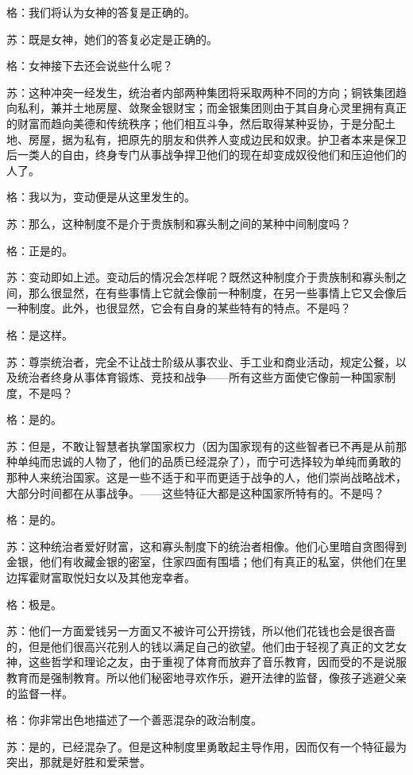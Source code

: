 \documentclass[12pt,oneside]{book}
\begin{document}
格：我们将认为女神的答复是正确的。

苏：既是女神，她们的答复必定是正确的。

格：女神接下去还会说些什么呢？

苏：这种冲突一经发生，统治者内部两种集团将采取两种不同的方向；铜铁集团趋向私利，兼并土地房屋、敛聚金银财宝；而金银集团则由于其自身心灵里拥有真正的财富而趋向美德和传统秩序；他们相互斗争，然后取得某种妥协，于是分配土地、房屋，据为私有，把原先的朋友和供养人变成边民和奴隶。护卫者本来是保卫后一类人的自由，终身专门从事战争捍卫他们的现在却变成奴役他们和压迫他们的人了。

格：我以为，变动便是从这里发生的。

苏：那么，这种制度不是介于贵族制和寡头制之间的某种中间制度吗？

格：正是的。

苏：变动即如上述。变动后的情况会怎样呢？既然这种制度介于贵族制和寡头制之间，那么很显然，在有些事情上它就会像前一种制度，在另一些事情上它又会像后一种制度。此外，也很显然，它会有自身的某些特有的特点。不是吗？

格：是这样。

苏：尊崇统治者，完全不让战士阶级从事农业、手工业和商业活动，规定公餐，以及统治者终身从事体育锻炼、竞技和战争——所有这些方面使它像前一种国家制度，不是吗？

格：是的。

苏：但是，不敢让智慧者执掌国家权力（因为国家现有的这些智者已不再是从前那种单纯而忠诚的人物了，他们的品质已经混杂了），而宁可选择较为单纯而勇敢的那种人来统治国家。这是一些不适于和平而更适于战争的人，他们崇尚战略战术，大部分时间都在从事战争。——这些特征大都是这种国家所特有的。不是吗？

格：是的。

苏：这种统治者爱好财富，这和寡头制度下的统治者相像。他们心里暗自贪图得到金银，他们有收藏金银的密室，住家四面有围墙；他们有真正的私室，供他们在里边挥霍财富取悦妇女以及其他宠幸者。

格：极是。

苏：他们一方面爱钱另一方面又不被许可公开捞钱，所以他们花钱也会是很吝啬的，但是他们很高兴花别人的钱以满足自己的欲望。他们由于轻视了真正的文艺女神，这些哲学和理论之友，由于重视了体育而放弃了音乐教育，因而受的不是说服教育而是强制教育。所以他们秘密地寻欢作乐，避开法律的监督，像孩子逃避父亲的监督一样。

格：你非常出色地描述了一个善恶混杂的政治制度。

苏：是的，已经混杂了。但是这种制度里勇敢起主导作用，因而仅有一个特征最为突出，那就是好胜和爱荣誉。
\end{document}
